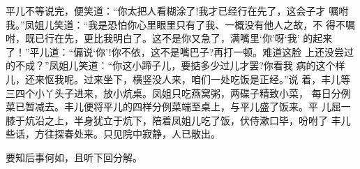 平儿不等说完，便笑道：“你太把人看糊涂了!我才已经行在先了，这会子才
嘱咐我。”凤姐儿笑道：“我是恐怕你心里眼里只有了我、一概没有他人之故，不
得不嘱咐，既已行在先，更比我明白了。这不是你又急了，满嘴里‘你’呀‘我’
的起来了！”平儿道：“偏说‘你’!你不依，这不是嘴巴子?再打一顿。难道这脸
上还没尝过的不成？”凤姐儿笑道：“你这小蹄子儿，要掂多少过儿才罢?你看我
病的这个样儿，还来怄我呢。过来坐下，横竖没人来，咱们一处吃饭是正经。”说
着，丰儿等三四个小丫头子进来，放小炕桌。凤姐只吃燕窝粥，两碟子精致小菜，
每日分例菜已暂减去。丰儿便将平儿的四样分例菜端至桌上，与平儿盛了饭来。平
儿屈一膝于炕沿之上，半身犹立于炕下，陪着凤姐儿吃了饭，伏侍漱口毕，吩咐了
丰儿些话，方往探春处来。只见院中寂静，人已散出。

要知后事何如，且听下回分解。
